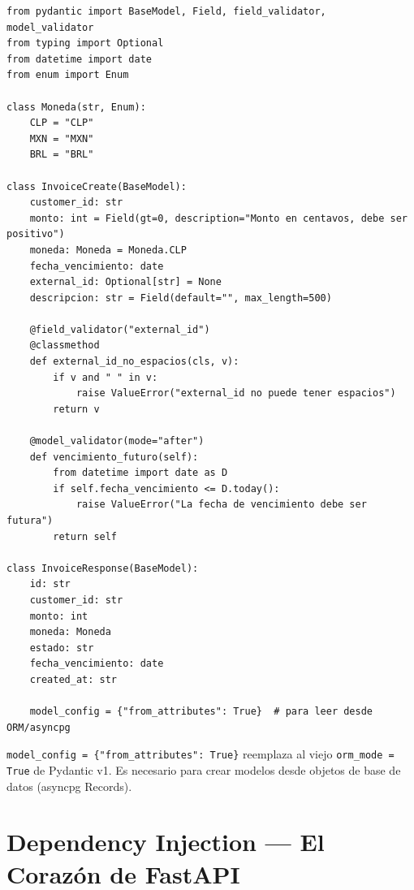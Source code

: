 \documentclass[11pt,a4paper]{article}
\begin{document}
\begin{lstlisting}[style=python]
from pydantic import BaseModel, Field, field_validator, model_validator
from typing import Optional
from datetime import date
from enum import Enum

class Moneda(str, Enum):
    CLP = "CLP"
    MXN = "MXN"
    BRL = "BRL"

class InvoiceCreate(BaseModel):
    customer_id: str
    monto: int = Field(gt=0, description="Monto en centavos, debe ser positivo")
    moneda: Moneda = Moneda.CLP
    fecha_vencimiento: date
    external_id: Optional[str] = None
    descripcion: str = Field(default="", max_length=500)

    @field_validator("external_id")
    @classmethod
    def external_id_no_espacios(cls, v):
        if v and " " in v:
            raise ValueError("external_id no puede tener espacios")
        return v

    @model_validator(mode="after")
    def vencimiento_futuro(self):
        from datetime import date as D
        if self.fecha_vencimiento <= D.today():
            raise ValueError("La fecha de vencimiento debe ser futura")
        return self

class InvoiceResponse(BaseModel):
    id: str
    customer_id: str
    monto: int
    moneda: Moneda
    estado: str
    fecha_vencimiento: date
    created_at: str

    model_config = {"from_attributes": True}  # para leer desde ORM/asyncpg
\end{lstlisting}

\begin{tipbox}
\texttt{model\_config = \{"from\_attributes": True\}} reemplaza al viejo \texttt{orm\_mode = True} de Pydantic v1.
Es necesario para crear modelos desde objetos de base de datos (asyncpg Records).
\end{tipbox}

\section{Dependency Injection — El Corazón de FastAPI}
\end{document}
